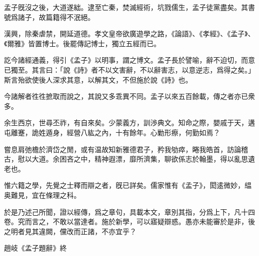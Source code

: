 孟子旣沒之後，大道遂絀。逮至亡秦，焚滅經術，坑戮儒生，孟子徒黨盡矣。其書號爲諸子，故篇籍得不泯絕。

漢興，除秦虐禁，開延道德。孝文皇帝欲廣遊學之路，《論語》、《孝經》、《孟子》、《爾雅》皆置博士。後罷傳記博士，獨立五經而已。

訖今諸經通義，得引《孟子》以明事，謂之博文。孟子長於譬喻，辭不迫切，而意已獨至。其言曰：「說《詩》者不以文害辭，不以辭害志，以意逆志，爲得之矣。」斯言殆欲使後人深求其意，以解其文，不但施於說《詩》也。

今諸解者徃徃摭取而說之，其說又多乖異不同。孟子以來五百餘載，傳之者亦已衆多。

余生西京，世尋丕祚，有自來矣。少蒙義方，訓渉典文。知命之際，嬰戚于天，遘屯離蹇，詭姓遁身，經營八紘之內，十有餘年。心勦形瘵，何勤如焉？

嘗息肩弛檐於濟岱之閒，或有温故知新雅德君子，矜我劬瘁，睠我皓首，訪論稽古，慰以大道。余困吝之中，精神遐漂，靡所濟集，聊欲係志於翰墨，得以亂思遺老也。

惟六籍之學，先覺之士釋而辯之者，旣已詳矣。儒家惟有《孟子》，閎逺微妙，緼奥難見，宜在條理之科。

於是乃述己所聞，證以經傳，爲之章句，具載本文，章別其指，分爲上下，凡十四卷。究而言之，不敢以當達者。施於新學，可以寤疑辯惑。愚亦未能審於是非，後之明者見其違闕，儻改而正諸，不亦宜乎？


\begin{jieshu}
趙岐《孟子題辭》終
\end{jieshu}

